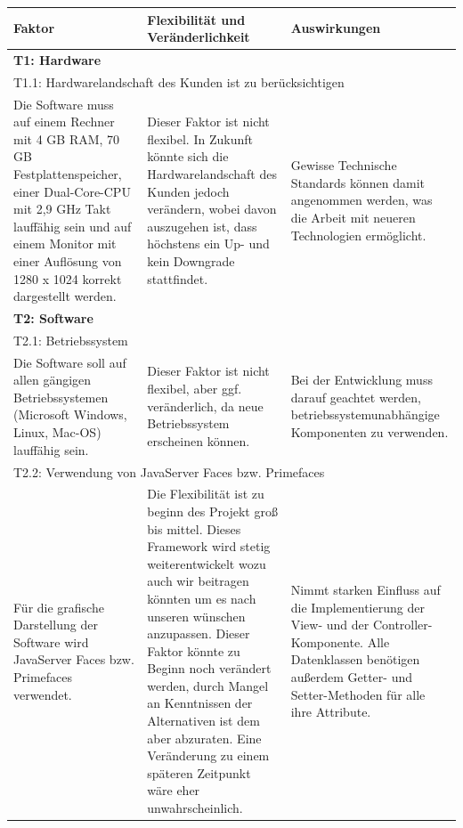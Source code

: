 \documentclass[fontsize=12pt,paper=a4,twoside]{scrartcl}
\begin{document}
\begin{tabularx}{\textwidth}{|X|X|X|}
\hline
\textbf{Faktor} & \textbf{Flexibilität und Veränderlichkeit} & \textbf{Auswirkungen}\\\hline
\hline
\multicolumn{3}{|l|}{\textbf{T1: Hardware}}\\\hline
\multicolumn{3}{|l|}{T1.1: Hardwarelandschaft des Kunden ist zu berücksichtigen}\\\hline
Die Software muss auf einem Rechner mit 4 GB RAM, 70 GB Festplattenspeicher, einer Dual-Core-CPU mit 2,9 GHz Takt lauffähig sein und auf einem Monitor mit einer Auflösung von 1280 x 1024 korrekt dargestellt werden. & Dieser Faktor ist nicht flexibel. In Zukunft könnte sich die Hardwarelandschaft des Kunden jedoch verändern, wobei davon auszugehen ist, dass höchstens ein Up- und kein Downgrade stattfindet. & Gewisse Technische Standards können damit angenommen werden, was die Arbeit mit neueren Technologien ermöglicht. %
 \\\hline

\multicolumn{3}{|l|}{\textbf{T2: Software}}\\\hline
\multicolumn{3}{|l|}{T2.1: Betriebssystem}\\\hline
Die Software soll auf allen gängigen Betriebssystemen (Microsoft Windows, Linux, Mac-OS) lauffähig sein. & Dieser Faktor ist nicht flexibel, aber ggf. veränderlich, da neue Betriebssystem erscheinen können. & Bei der Entwicklung muss darauf geachtet werden, betriebssystemunabhängige Komponenten zu verwenden.\\\hline
\multicolumn{3}{|l|}{T2.2: Verwendung von JavaServer Faces bzw. Primefaces}\\\hline
Für die grafische Darstellung der Software wird JavaServer Faces bzw. Primefaces verwendet. &
Die Flexibilität ist zu beginn des Projekt groß bis mittel. Dieses Framework wird stetig weiterentwickelt wozu auch wir beitragen könnten um es nach unseren wünschen anzupassen.
 Dieser Faktor könnte zu Beginn noch verändert werden, durch Mangel an Kenntnissen der Alternativen ist dem aber abzuraten. Eine Veränderung zu einem späteren Zeitpunkt wäre eher unwahrscheinlich. & Nimmt starken Einfluss auf die Implementierung der View- und der Controller-Komponente. Alle Datenklassen benötigen außerdem Getter- und Setter-Methoden für alle ihre Attribute. \\\hline
\end{tabularx} \newpage
\end{document}
